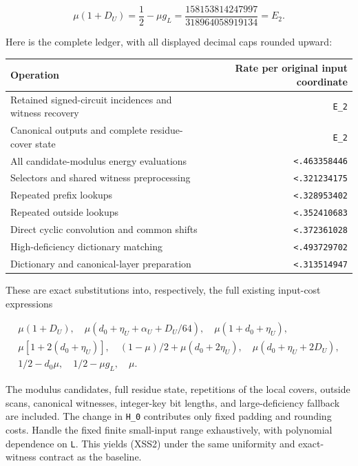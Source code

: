\[
\mu(1+D_U)=\frac12-\mu g_L
 =\frac{158153814247997}{318964058919134}=E_2.
 \tag{XSS31}
\]

Here is the complete ledger, with all displayed decimal caps rounded upward:

\begin{longtable}[]{@{}lr@{}}
\toprule\noalign{}
Operation & Rate per original input coordinate \\
\midrule\noalign{}
\endhead
\bottomrule\noalign{}
\endlastfoot
Retained signed-circuit incidences and witness recovery & \texttt{E\_2} \\
Canonical outputs and complete residue-cover state & \texttt{E\_2} \\
All candidate-modulus energy evaluations & \texttt{\textless{}.463358446} \\
Selectors and shared witness preprocessing & \texttt{\textless{}.321234175} \\
Repeated prefix lookups & \texttt{\textless{}.328953402} \\
Repeated outside lookups & \texttt{\textless{}.352410683} \\
Direct cyclic convolution and common shifts & \texttt{\textless{}.372361028} \\
High-deficiency dictionary matching & \texttt{\textless{}.493729702} \\
Dictionary and canonical-layer preparation & \texttt{\textless{}.313514947} \\
\end{longtable}

These are exact substitutions into, respectively, the full existing input-cost expressions

\[
\begin{gathered}
 \mu(1+D_U),\quad
 \mu(d_0+\eta_U+\alpha_U+D_U/64),\quad
 \mu(1+d_0+\eta_U),\\
 \mu[1+2(d_0+\eta_U)],\quad
 (1-\mu)/2+\mu(d_0+2\eta_U),\quad
 \mu(d_0+\eta_U+2D_U),\\
 1/2-d_0\mu,\quad 1/2-\mu g_L,\quad \mu.
 \end{gathered}
 \tag{XSS32}
\]

The modulus candidates, full residue state, repetitions of the local covers, outside scans, canonical witnesses, integer-key bit lengths, and large-deficiency fallback are included. The change in \texttt{H\_0} contributes only fixed padding and rounding costs. Handle the fixed finite small-input range exhaustively, with polynomial dependence on \texttt{L}. This yields (XSS2) under the same uniformity and exact-witness contract as the baseline.

